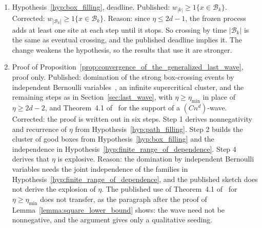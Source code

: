 \documentclass[12pt]{amsart}
\begin{document}
\begin{enumerate}
\item[C13.] Hypothesis~\ref{hyp:box_filling}, deadline. Published: $w_{|k|}\geq1\{x\in\mathcal B_k\}$. Corrected: $w_{|\mathcal B_k|}\geq1\{x\in\mathcal B_k\}$. Reason: since $\eta\leq2d-1$, the frozen process adds at least one site at each step until it stops. So crossing by time $|\mathcal B_k|$ is the same as eventual crossing, and the published deadline implies it. The change weakens the hypothesis, so the results that use it are stronger.
\item[C14.] Proof of Proposition~\ref{prop:convergence_of_the_generalized_last_wave}, proof only. Published: domination of the strong box-crossing events by independent Bernoulli variables~\cite{liggett1997domination}, an infinite supercritical cluster, and the remaining steps as in Section~\ref{sec:last_wave}, with $\eta\geq\eta_{\min}$ in place of $\eta\geq2d-2$, and Theorem~4.1 of~\cite{levine2009strong} for the support of a $(Cn^d)$-wave. Corrected: the proof is written out in six steps. Step 1 derives nonnegativity and recurrence of $\eta$ from Hypothesis~\ref{hyp:path_filling}. Step 2 builds the cluster of good boxes from Hypothesis~\ref{hyp:box_filling} and the independence in Hypothesis~\ref{hyp:finite_range_of_dependence}. Step 4 derives that $\eta$ is explosive. Reason: the domination by independent Bernoulli variables needs the joint independence of the families in Hypothesis~\ref{hyp:finite_range_of_dependence}, and the published sketch does not derive the explosion of $\eta$. The published use of Theorem~4.1 of~\cite{levine2009strong} for $\eta\geq\eta_{\min}$ does not transfer, as the paragraph after the proof of Lemma~\ref{lemma:square_lower_bound} shows: the wave need not be nonnegative, and the argument gives only a qualitative seeding.

\end{enumerate}
\end{document}
